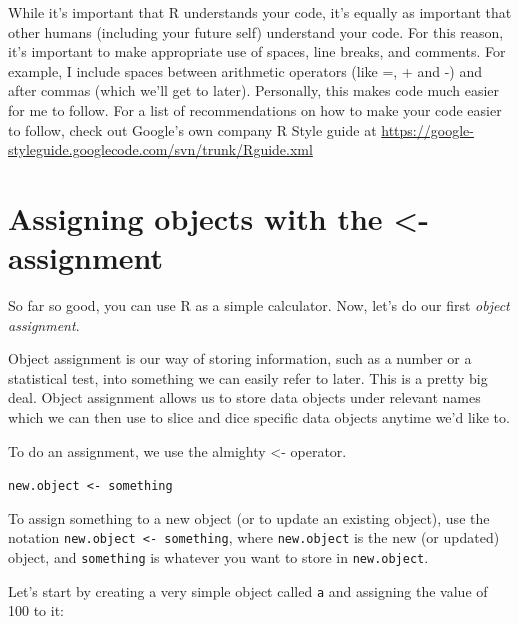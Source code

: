 \documentclass{tufte-book}\usepackage[]{graphicx}\usepackage[]{color}
\newcommand{\newfun}[1]{\begin{LARGE} \begin{center} \texttt{#1} \end{center} \end{LARGE}}
\begin{document}
While it's important that R understands your code, it's equally as important that other humans (including your future self) understand your code. For this reason, it's important to make appropriate use of spaces, line breaks, and comments. For example, I include spaces between arithmetic operators (like =, + and -) and after commas (which we'll get to later). Personally, this makes code much easier for me to follow. For a list of recommendations on how to make your code easier to follow, check out Google's own company R Style guide at \textcolor{blue}{\href{<https://google-styleguide.googlecode.com/svn/trunk/Rguide.xml>}{https://google-styleguide.googlecode.com/svn/trunk/Rguide.xml}}

\section{Assigning objects with the <- assignment}


So far so good, you can use R as a simple calculator. Now, let's do our first \textit{object assignment}.

Object assignment is our way of storing information, such as a number or a statistical test, into something we can easily refer to later. This is a pretty big deal. Object assignment allows us to store data objects under relevant names which we can then use to slice and dice specific data objects anytime we'd like to.

To do an assignment, we use the almighty <- operator.

\newfun{new.object <- something}


To assign something to a new object (or to update an existing object), use the notation \texttt{new.object <- something}, where \texttt{new.object} is the new (or updated) object, and \texttt{something} is whatever you want to store in \texttt{new.object}.

Let's start by creating a very simple object called \texttt{a} and assigning the value of 100 to it:
\end{document}
